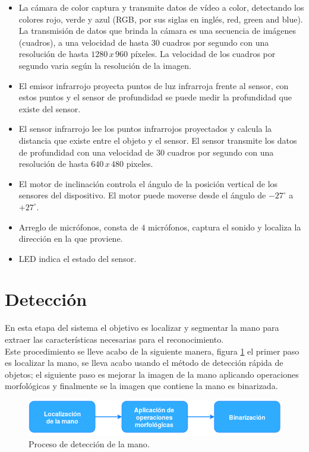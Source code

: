 \begin{itemize}
\item La cámara de color captura y transmite datos de vídeo a color, detectando los colores rojo, verde y azul (RGB, por sus siglas en ingl\'es, red, green and blue). La transmisión de datos que brinda la cámara es una secuencia de imágenes (cuadros), a una velocidad de hasta $30$ cuadros por segundo con una resolución de hasta $1280\, x \, 960$ p\'ixeles. La velocidad de los cuadros por segundo varia según la resolución de la imagen.
\item El emisor infrarrojo proyecta puntos de luz infrarroja frente al sensor, con estos puntos y el sensor de profundidad se puede medir la profundidad que existe del sensor.
\item El sensor infrarrojo lee los puntos infrarrojos proyectados y calcula la distancia que existe entre el objeto y el sensor. El sensor transmite los datos de profundidad con una velocidad de $30$ cuadros por segundo con una resolución de hasta $640 \, x \, 480$ pixeles.   
\item El motor de inclinación controla el \'angulo de la posición vertical de los sensores del dispositivo. El motor puede moverse desde el \'angulo de $-27^ \circ$ a $+27^\circ$. 
\item Arreglo de micrófonos, consta de $4$ micrófonos, captura el sonido y localiza la dirección en la que proviene. 
\item LED indica el estado del sensor.
\end{itemize}



\section{Detección}\label{sec:Detection}

En esta etapa del sistema el objetivo es localizar y segmentar la mano para extraer las características necesarias para el reconocimiento.\\
Este procedimiento se lleve acabo de la siguiente manera, figura  \ref{fig:ProcesoDeteccion} el primer paso es localizar la mano, se lleva acabo usando el método de detección rápida de objetos; el siguiente paso es mejorar la imagen de la mano aplicando operaciones morfológicas y finalmente se la imagen que contiene la mano es binarizada. 

\begin{figure}[h!]
\begin{center}
\includegraphics[scale=.7]{./Figures/Detection.png}
\end{center}
\caption{Proceso de detección de la mano.}
\label{fig:ProcesoDeteccion}
\end{figure} 

